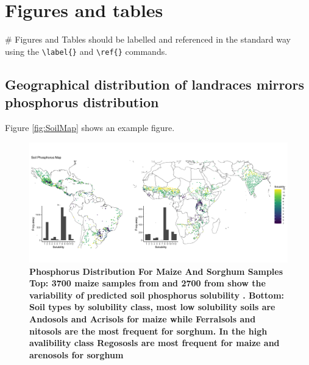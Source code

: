 \documentclass[9pt,twocolumn,twoside,lineno]{gsajnl}
\begin{document}
\section{Figures and tables}

# Figures and Tables should be labelled and referenced in the standard way using the \verb|\label{}| and \verb|\ref{}| commands.

\subsection{ Geographical distribution of landraces mirrors phosphorus distribution}

Figure \ref{fig:SoilMap} shows an example figure.

\begin{figure}[ht]
\centering
\includegraphics[width=0.8\paperwidth]{Figures/Fig1_SoilMap.png}
\caption{\bf{Phosphorus Distribution For Maize And Sorghum Samples} Top: 3700 maize samples from \cite{romeronavarro2017} and 2700 from \cite{lasky2015} show the variability of predicted soil  phosphorus solubility \cite{batjes2011}. Bottom: Soil types by solubility class, most low solubility soils are Andosols and Acrisols for maize while Ferralsols and nitosols are the most frequent for sorghum. In the high avalibility class  Regososls are most frequent for maize and arenosols for sorghum}


\end{figure}
\end{document}
